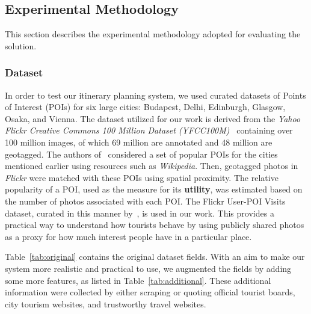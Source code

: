\subsection{Experimental Methodology}
This section describes the experimental methodology adopted for evaluating the \trip solution. 

\subsubsection{\textbf{Dataset}}
\label{sec:dataset}

In order to test our itinerary planning system, we used curated datasets of Points of Interest (POIs) for six large cities: Budapest, Delhi, Edinburgh, Glasgow, Osaka, and Vienna. 
The dataset utilized for our work is derived from the \emph{Yahoo Flickr Creative Commons 100 Million Dataset (YFCC100M)}~\citep{taylor2018tour} containing over 100 million images, of which 69 million are annotated and 48 million are geotagged.
%
The authors of~\citep{taylor2018tour} considered a set of popular POIs for the cities mentioned earlier using resources such as \emph{Wikipedia}. Then, geotagged photos in \emph{Flickr} were matched with these POIs using spatial proximity. The relative popularity of a POI, used as the measure for its \textbf{utility}, was estimated based on the number of photos associated with each POI. The Flickr User-POI Visits dataset, curated in this manner by~\citep{limkwanhuiDataCode}, is used in our work.
This provides a practical way to understand how tourists behave by using publicly shared photos as a proxy for how much interest people have in a particular place.

Table~\ref{tab:original} contains the original dataset fields. With an aim to make our system more realistic and practical to use, we augmented the fields by adding some more features, as listed in Table~\ref{tab:additional}.
These additional information were collected by either scraping or quoting official tourist boards, city tourism websites, and trustworthy travel websites.

